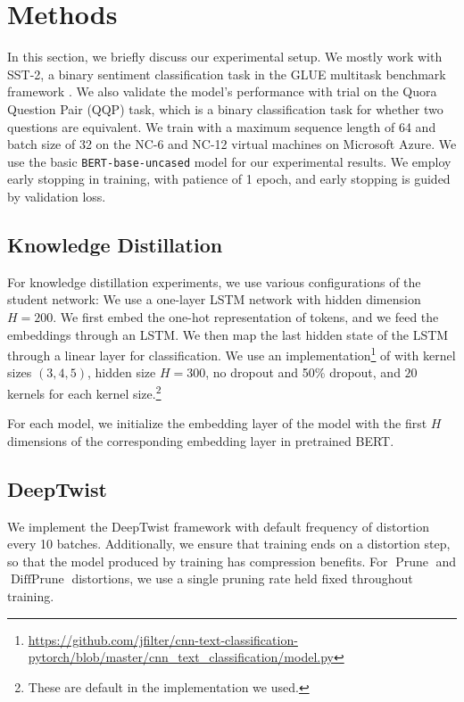 \documentclass[10pt]{article}
\newcommand{\prune}{\operatorname{Prune}}
\newcommand{\diffprune}{\operatorname{DiffPrune}}
\begin{document}
\section{Methods}
In this section, we briefly discuss our experimental setup. We mostly
work with
SST-2, a binary sentiment classification task in the GLUE multitask benchmark
framework \citep{wang2018glue}. We also validate the model's
performance with trial on the Quora Question Pair (QQP) task, which is a
binary classification task for whether two questions are equivalent. We
train with a maximum sequence length of 64 and batch size of 32 on the
NC-6 and NC-12 virtual machines on Microsoft Azure. We use the basic 
\texttt{BERT-base-uncased} model for our experimental results. We employ
early stopping in training, with patience of 1 epoch, and early stopping is
guided by validation loss. 

\subsection{Knowledge Distillation}

For knowledge distillation experiments, we use various configurations of the
student network:  We use a one-layer LSTM network with hidden
dimension $H=200$. We first embed the one-hot representation of tokens, and we
feed the embeddings through an LSTM. We then map the last hidden state of the
LSTM through a linear layer for classification.   We use an
implementation\footnote{\url{https://github.com/jfilter/cnn-text-classification-pytorch/blob/master/cnn_text_classification/model.py}}
of \citet{kim2014convolutional} with kernel sizes $(3,4,5)$, hidden size
$H=300$, no dropout and 50\% dropout, and $20$ kernels for each kernel
size.\footnote{These are default in the implementation we used.} 

For each model, we initialize the embedding layer of the model with the
first $H$ dimensions of the corresponding embedding layer in pretrained
BERT. 

\subsection{DeepTwist}
We implement the DeepTwist framework with default frequency of distortion
every 10 batches. Additionally, we ensure that training ends on a
distortion step, so that the model produced by training has compression
benefits. For $\prune$ and $\diffprune$ distortions, we use a single
pruning rate held fixed throughout training. 
\end{document}

